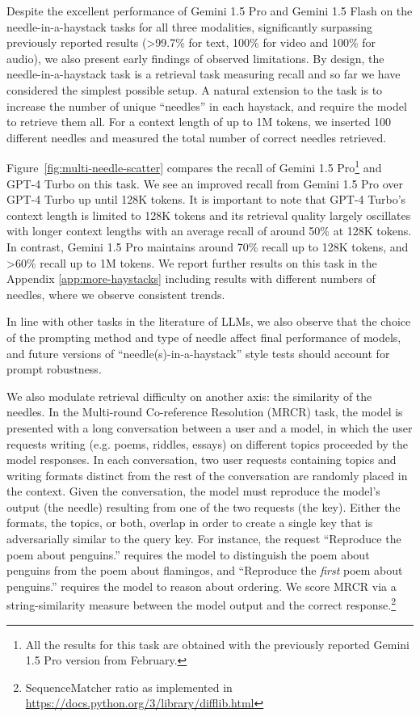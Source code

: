 Despite the excellent performance of Gemini 1.5 Pro and Gemini 1.5 Flash on the needle-in-a-haystack tasks for all three modalities, significantly surpassing previously reported results (>99.7\% for text, 100\% for video and 100\% for audio), we also present early findings of observed limitations. By design, the needle-in-a-haystack task is a retrieval task measuring recall and so far we have considered the simplest possible setup. A natural extension to the task is to increase the number of unique ``needles'' in each haystack, and require the model to retrieve them all. For a context length of up to 1M tokens, we inserted 100 different needles and measured the total number of correct needles retrieved.

Figure~\ref{fig:multi-needle-scatter} compares the recall of Gemini 1.5 Pro\footnote{All the results for this task are obtained with the previously reported Gemini 1.5 Pro version from February.} and GPT-4 Turbo on this task. We see an improved recall from Gemini 1.5 Pro over GPT-4 Turbo up until 128K tokens.  It is important to note that GPT-4 Turbo's context length is limited to 128K tokens and its retrieval quality largely oscillates with longer context lengths with an average recall of around 50\% at 128K tokens. In contrast, Gemini 1.5 Pro maintains around 70\% recall up to 128K tokens, and >60\% recall up to 1M tokens. We report further results on this task in the Appendix \ref{app:more-haystacks} including results with different numbers of needles, where we observe consistent trends.

In line with other tasks in the literature of LLMs, we also observe that the choice of the prompting method and type of needle affect final performance of models, and future versions of ``needle(s)-in-a-haystack'' style tests should account for prompt robustness.

We also modulate retrieval difficulty on another axis: the similarity of the needles. In the Multi-round Co-reference Resolution (MRCR) task, the model is presented with a long conversation between a user and a model, in which the user requests writing (e.g. poems, riddles, essays) on different topics proceeded by the model responses. In each conversation, two user requests containing topics and writing formats distinct from the rest of the conversation are randomly placed in the context. Given the conversation, the model must reproduce the model's output (the needle) resulting from one of the two requests (the key). Either the formats, the topics, or both, overlap in order to create a single key that is adversarially similar to the query key. For instance, the request ``Reproduce the poem about penguins.'' requires the model to distinguish the poem about penguins from the poem about flamingos, and ``Reproduce the \textit{first} poem about penguins.'' requires the model to reason about ordering. We score MRCR via a string-similarity measure between the model output and the correct response.\footnote{SequenceMatcher ratio as implemented in \url{https://docs.python.org/3/library/difflib.html}}

